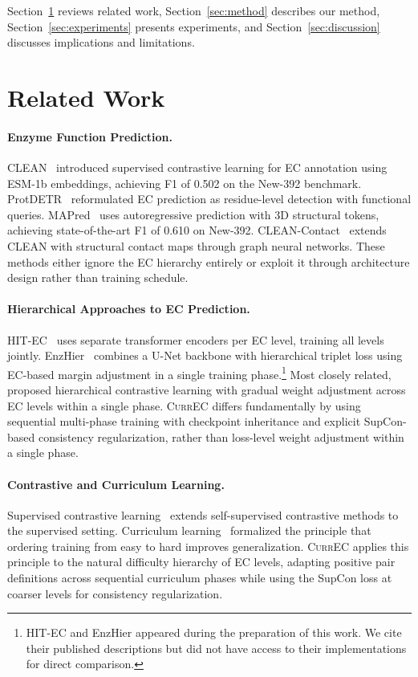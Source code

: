 \documentclass{article}
\newcommand{\currec}{\textsc{CurrEC}}
\begin{document}
Section~\ref{sec:related} reviews related work, Section~\ref{sec:method} describes our method, Section~\ref{sec:experiments} presents experiments, and Section~\ref{sec:discussion} discusses implications and limitations.

\section{Related Work}\label{sec:related}

\paragraph{Enzyme Function Prediction.}
CLEAN~\citep{yu2023enzyme} introduced supervised contrastive learning for EC annotation using ESM-1b embeddings, achieving F1 of 0.502 on the New-392 benchmark. ProtDETR~\citep{yang2025interpretable} reformulated EC prediction as residue-level detection with functional queries. MAPred~\citep{rong2025autoregressive} uses autoregressive prediction with 3D structural tokens, achieving state-of-the-art F1 of 0.610 on New-392. CLEAN-Contact~\citep{yang2024improved} extends CLEAN with structural contact maps through graph neural networks. These methods either ignore the EC hierarchy entirely or exploit it through architecture design rather than training schedule.

\paragraph{Hierarchical Approaches to EC Prediction.}
HIT-EC~\citep{dumontet2026trustworthy} uses separate transformer encoders per EC level, training all levels jointly. EnzHier~\citep{duan2026enzhier} combines a U-Net backbone with hierarchical triplet loss using EC-based margin adjustment in a single training phase.\footnote{HIT-EC and EnzHier appeared during the preparation of this work. We cite their published descriptions but did not have access to their implementations for direct comparison.} Most closely related, \citet{yim2024hierarchical} proposed hierarchical contrastive learning with gradual weight adjustment across EC levels within a single phase. \currec{} differs fundamentally by using sequential multi-phase training with checkpoint inheritance and explicit SupCon-based consistency regularization, rather than loss-level weight adjustment within a single phase.

\paragraph{Contrastive and Curriculum Learning.}
Supervised contrastive learning~\citep{khosla2020supervised} extends self-supervised contrastive methods to the supervised setting. Curriculum learning~\citep{bengio2009curriculum} formalized the principle that ordering training from easy to hard improves generalization. \currec{} applies this principle to the natural difficulty hierarchy of EC levels, adapting positive pair definitions across sequential curriculum phases while using the SupCon loss at coarser levels for consistency regularization.
\end{document}
